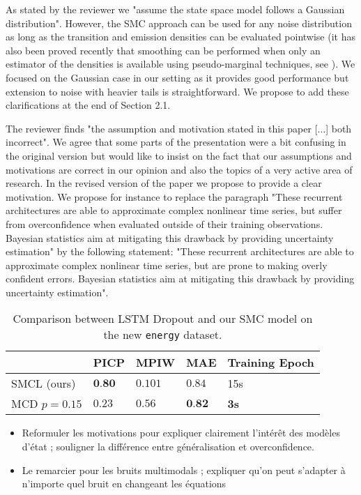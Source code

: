 \documentclass{article}
\begin{document}
As stated by the reviewer we "assume the state space model follows a Gaussian distribution".
However, the SMC approach can be used for any noise distribution as long as the transition and emission densities can be evaluated pointwise (it has also been proved recently that smoothing can be performed when only an estimator of the densities is available using pseudo-marginal techniques, see \cite{papier gloaguen lecorff Olsson}).
We focused on the Gaussian case in our setting as it provides good performance but extension to noise with heavier tails is straightforward.
We propose to add these clarifications at the end of Section 2.1.

The reviewer finds "the assumption and motivation stated in this paper [...] both incorrect".
We agree that some parts of the presentation were a bit confusing in the original version but would like to insist on the fact that our assumptions and motivations are correct in our opinion and also the topics of a very active area of research.
In the revised version of the paper we propose to provide a clear motivation.
We propose for instance to replace the paragraph "These recurrent architectures are able to approximate complex nonlinear time series, but suffer from overconfidence when evaluated outside of their training observations. Bayesian statistics aim at mitigating this drawback by providing uncertainty estimation" by the following statement: "These recurrent architectures are able to approximate complex nonlinear time series, but are prone to making overly confident errors. Bayesian statistics aim at mitigating this drawback by providing uncertainty estimation".

\begin{table}[htpb]
	\centering
	\caption{Comparison between LSTM Dropout and our SMC model on the new \texttt{energy} dataset.}
	\label{tab:comparison}
	\begin{tabular}{lllll}
		\toprule
		             & PICP            & MPIW    & MAE             & Training Epoch \\
		\toprule
		SMCL (ours)  & $\textbf{0.80}$ & $0.101$ & $0.84$          & 15s            \\
		MCD $p=0.15$ & $0.23$          & $0.56$  & $\textbf{0.82}$ & \textbf{3s}    \\
		\bottomrule
	\end{tabular}
\end{table}

\begin{itemize}
	\item Reformuler les motivations pour expliquer clairement l'intérêt des modèles d'état ; souligner la différence entre généralisation et overconfidence.
	\item Le remarcier pour les bruits multimodals ; expliquer qu'on peut s'adapter à n'importe quel bruit en changeant les équations
\end{itemize}



\end{document}
